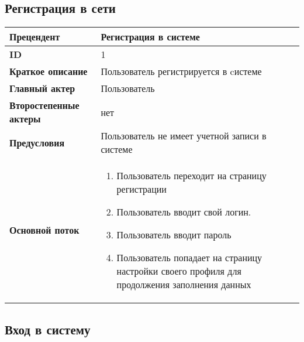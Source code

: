 \documentclass{article}
\begin{document}
\subsection{Регистрация в сети}
  \begin{tabular}{|l|p{9cm}|}
  \hline
  \textbf{Прецендент} & Регистрация в системе \\
  \hline
  \textbf{ID} & 1 \\
  \hline
  \textbf{Краткое описание} & Пользователь регистрируется в cистеме \\
  \hline
  \textbf{Главный актер} & Пользователь\\
  \hline
  \textbf{Второстепенные актеры} & нет \\
  \hline
  \textbf{Предусловия} &  Пользователь не имеет учетной записи в системе\\
  \hline
  \textbf{Основной поток} & \begin{enumerate}
    \item Пользователь переходит на страницу регистрации
    \item Пользователь вводит свой логин.
    \item Пользователь вводит пароль
    \item Пользователь попадает на страницу настройки своего профиля для продолжения заполнения данных
  \end{enumerate} \\
  \hline
\end{tabular}

\subsection{Вход в систему}
\end{document}
